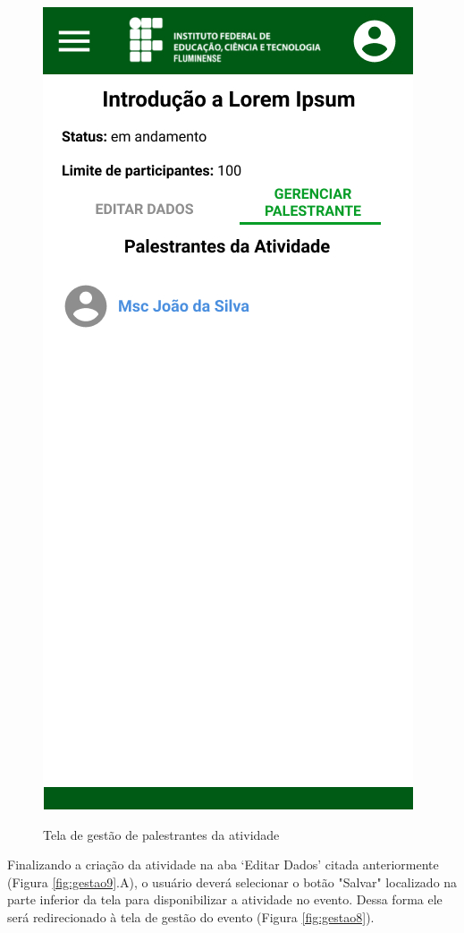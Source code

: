 \begin{figure}[H]
    \centering
    \caption{Tela de gestão de palestrantes da atividade}
    \includegraphics[scale=0.44]{figuras/Gestao/11-GestaoPalestrantes.jpg}
    \label{fig:gestao11}
\end{figure}

Finalizando a criação da atividade na aba ‘Editar Dados’ citada anteriormente (Figura \ref{fig:gestao9}.A), o usuário deverá selecionar o botão "Salvar" \hspace{1mm} localizado na parte inferior da tela para disponibilizar a atividade no evento. Dessa forma ele será redirecionado à tela de gestão do evento (Figura \ref{fig:gestao8}).

